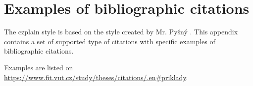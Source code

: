 \chapter{Examples of bibliographic citations}
\label{priloha-priklady-citaci}
The czplain style is based on the style created by Mr. Pyšný \cite{Pysny}. This appendix contains a set of supported type of citations with specific examples of bibliographic citations.

Examples are listed on \url{https://www.fit.vut.cz/study/theses/citations/.en#priklady}.

%
%
